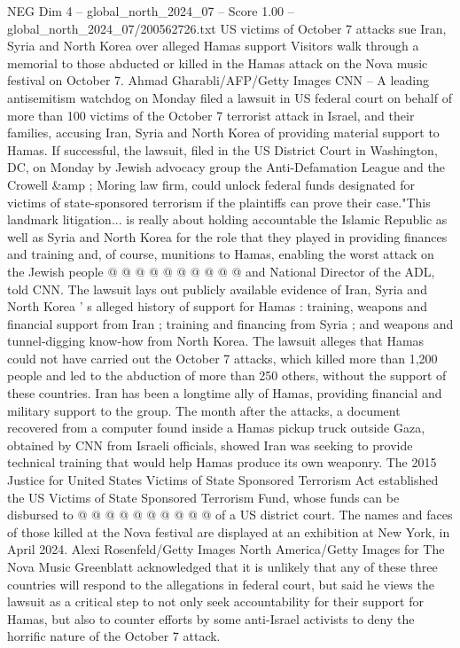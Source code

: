 \begin{textsample}{NEG Dim 4 – global\_north\_2024\_07 – Score 1.00 – global\_north\_2024\_07/200562726.txt}  \label{ex:f4_neg_281}
US victims of October 7 attacks sue Iran, Syria and North Korea over alleged Hamas support Visitors walk through a memorial to those abducted or killed in the Hamas attack on the Nova music festival on October 7.
Ahmad Gharabli/AFP/Getty Images CNN -- A leading antisemitism watchdog on Monday filed a lawsuit in US federal court on behalf of more than 100 victims of the October 7 terrorist attack in Israel, and their families, accusing Iran, Syria and North Korea of providing material support to Hamas.
If successful, the lawsuit, filed in the US District Court in Washington, DC, on Monday by Jewish advocacy group the Anti-Defamation League and the Crowell \&amp ; Moring law firm, could unlock federal funds designated for victims of state-sponsored terrorism if the plaintiffs can prove their case."This landmark litigation... is really about holding accountable the Islamic Republic as well as Syria and North Korea for the role that they played in providing finances and training and, of course, munitions to Hamas, enabling the worst attack on the Jewish people @ @ @ @ @ @ @ @ @ @ and National Director of the ADL, told CNN.
The lawsuit lays out publicly available evidence of Iran, Syria and North Korea ' s alleged history of support for Hamas : training, weapons and financial support from Iran ; training and financing from Syria ; and weapons and tunnel-digging know-how from North Korea.
The lawsuit alleges that Hamas could not have carried out the October 7 attacks, which killed more than 1,200 people and led to the abduction of more than 250 others, without the support of these countries.
Iran has been a longtime ally of Hamas, providing financial and military support to the group.
The month after the attacks, a document recovered from a computer found inside a Hamas pickup truck outside Gaza, obtained by CNN from Israeli officials, showed Iran was seeking to provide technical training that would help Hamas produce its own weaponry.
The 2015 Justice for United States Victims of State Sponsored Terrorism Act established the US Victims of State Sponsored Terrorism Fund, whose funds can be disbursed to @ @ @ @ @ @ @ @ @ @ of a US district court.
The names and faces of those killed at the Nova festival are displayed at an exhibition at New York, in April 2024.
Alexi Rosenfeld/Getty Images North America/Getty Images for The Nova Music Greenblatt acknowledged that it is unlikely that any of these three countries will respond to the allegations in federal court, but said he views the lawsuit as a critical step to not only seek accountability for their support for Hamas, but also to counter efforts by some anti-Israel activists to deny the horrific nature of the October 7 attack.

\end{textsample}
